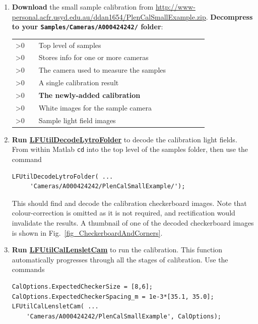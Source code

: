 \documentclass[onecolumn]{article}
\makeatletter
\newcommand{\Repeat}[1]{%
    \expandafter\@Repeat\expandafter{\the\numexpr #1\relax}%
}
\def\@Repeat#1{%
    \ifnum#1>0
        \expandafter\@@Repeat\expandafter{\the\numexpr #1-1\expandafter\relax\expandafter}%
    \else
        \expandafter\@gobble
    \fi
}
\def\@@Repeat#1#2{%
    \@Repeat{#1}{#2}#2%
}
\newcommand{\CiteFunc}[1]{\hyperlink{#1}{\small #1}}
\newcommand{\NewAnnotatedTree}[1]{\vspace{1em}\noindent\begin{tabular}{*{#1}{p{0.1em}}cp{6.5cm}}}
\newcommand{\EndAnnotatedTree}{\end{tabular}\vspace{1em}}
\newcommand{\AnnotatedTreeEntry}[4]{\Repeat{#1}{&}\multicolumn{#2}{l}{\SymbolText{#3}} & \small #4}
\newcommand{\SymbolText}[1]{\texttt{\small #1}}
\makeatother
\begin{document}
\begin{enumerate}[leftmargin=1.5em,rightmargin=0.5cm]

\item \textbf{Download} the small sample calibration from \url{http://www-personal.acfr.usyd.edu.au/ddan1654/PlenCalSmallExample.zip}.  \textbf{Decompress to your \SymbolText{Samples/Cameras/A000424242/} folder}:

\NewAnnotatedTree{6}
\AnnotatedTreeEntry{0}{7}{Samples}{Top level of samples}\\
\AnnotatedTreeEntry{1}{6}{Cameras}{Stores info for one or more cameras}\\
\AnnotatedTreeEntry{2}{5}{A000424242}{The camera used to measure the samples}\\
\AnnotatedTreeEntry{3}{4}{CalZoomedOutFixedFoc}{A single calibration result}\\
\AnnotatedTreeEntry{3}{4}{\normalsize{\textbf{PlenCalSmallExample}}}{\textbf{The newly-added calibration}}\\
\AnnotatedTreeEntry{3}{4}{WhiteImages}{White images for the sample camera}\\
\AnnotatedTreeEntry{1}{6}{Images}{Sample light field images}\\
\EndAnnotatedTree

\item \textbf{Run \CiteFunc{LFUtilDecodeLytroFolder}} to decode the calibration light fields.  From within Matlab \SymbolText{cd} into the top level of the samples folder, then use the command
\begin{Verbatim}
LFUtilDecodeLytroFolder( ... 
     'Cameras/A000424242/PlenCalSmallExample/');
\end{Verbatim}

This should find and decode the calibration checkerboard images.  Note that colour-correction is omitted as it is not required, and rectification would invalidate the results.  A thumbnail of one of the decoded checkerboard images is shown in Fig.~\ref{fig_CheckerboardAndCorners}.

\item \textbf{Run \CiteFunc{LFUtilCalLensletCam}} to run the calibration. This function automatically progresses through all the stages of calibration. Use the commands
\begin{Verbatim}
CalOptions.ExpectedCheckerSize = [8,6];
CalOptions.ExpectedCheckerSpacing_m = 1e-3*[35.1, 35.0];
LFUtilCalLensletCam( ...
    'Cameras/A000424242/PlenCalSmallExample', CalOptions);
\end{Verbatim}


\end{enumerate}
\end{document}
